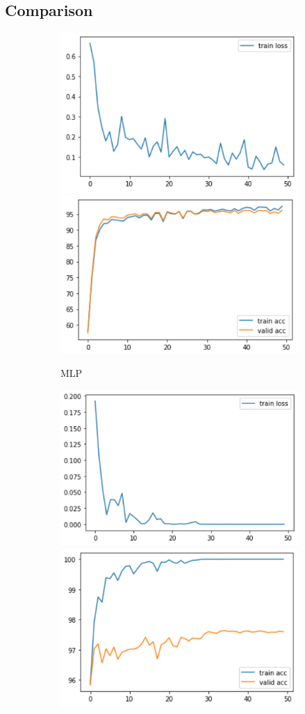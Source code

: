\documentclass[11pt]{article}
\begin{document}
\subsection{Comparison}\label{model}
    \begin{figure}[H]
        \begin{subfigure}[H]{1\textwidth}
            \includegraphics[width=0.5\linewidth]{img/MLP/loss.PNG}
            \includegraphics[width=0.5\linewidth]{img/MLP/acc.PNG}
            \caption{MLP}\vspace{2mm}
        \end{subfigure}
        \begin{subfigure}[H]{1\textwidth}
            \includegraphics[width=0.5\linewidth]{img/VGG/loss.PNG}
            \includegraphics[width=0.5\linewidth]{img/VGG/acc.PNG}

\end{subfigure}
\end{figure}
\end{document}
